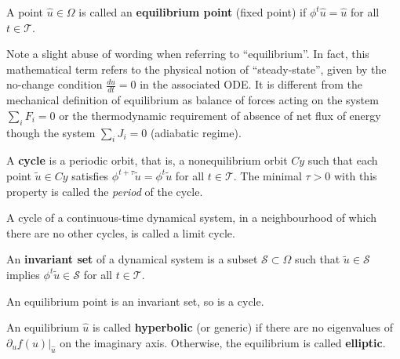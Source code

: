 \begin{definition}
	A point $\hat{u} \in \Omega$ is called an \textbf{equilibrium point} (fixed point) if $\phi^t\hat{u} = \hat{u}$ for all $t \in \mathcal{T}$.
\end{definition}
Note a slight abuse of wording when referring to ``equilibrium''. In fact, this mathematical term refers to the physical notion of ``steady-state'', given by the no-change condition $\frac{du}{dt} = 0$ in the associated \gls{ODE}. It is different from the mechanical definition of equilibrium as balance of forces acting on the system $\sum_{i} F_i = 0$ or the thermodynamic requirement of absence of net flux of energy though the system $\sum_{i} J_i = 0$ (adiabatic regime).
\begin{definition}
	A \textbf{cycle} is a periodic orbit, that is, a nonequilibrium orbit $Cy$ such that each point $\tilde{u} \in Cy$ satisfies $\phi^{t+\tau}\tilde{u} = \phi^t \tilde{u}$ for all $t \in \mathcal{T}$. The minimal $\tau > 0$ with this property is called the \textit{period} of the cycle.
\end{definition}
\begin{definition}
	A cycle of a continuous-time dynamical system, in a neighbourhood of which there are no other cycles, is called a limit cycle.
\end{definition}
\begin{definition}
	An \textbf{invariant set} of a dynamical system is a subset $\mathcal{S} \subset \Omega$ such that $\tilde{u} \in \mathcal{S}$ implies $\phi^t\tilde{u} \in \mathcal{S}$ for all $t \in \mathcal{T}$.
\end{definition}
An equilibrium point is an invariant set, so is a cycle.
\begin{definition}
	An equilibrium $\hat{u}$ is called \textbf{hyperbolic} (or generic) if there are no eigenvalues of $\partial_u f(u)|_{\hat{u}}$ on the imaginary axis. Otherwise, the equilibrium is called \textbf{elliptic}.
\end{definition}





